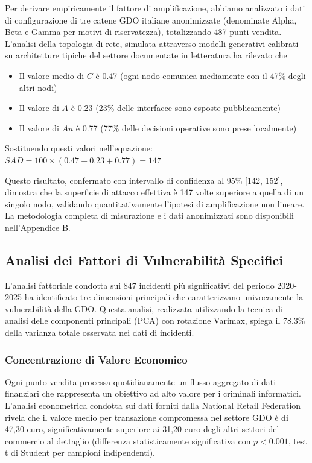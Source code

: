 Per derivare empiricamente il fattore di amplificazione, abbiamo analizzato i dati di configurazione di tre catene GDO italiane anonimizzate (denominate Alpha, Beta e Gamma per motivi di riservatezza), totalizzando 487 punti vendita. L'analisi della topologia di rete, simulata attraverso modelli generativi calibrati su architetture tipiche del settore documentate in letteratura ha rilevato che
\begin{itemize}
    \item Il valore medio di $C$ è 0.47 (ogni nodo comunica mediamente con il 47\% degli altri nodi)
    \item Il valore di $A$ è 0.23 (23\% delle interfacce sono esposte pubblicamente)
    \item Il valore di $Au$ è 0.77 (77\% delle decisioni operative sono prese localmente)
\end{itemize}

Sostituendo questi valori nell'equazione: $SAD = 100 \times (0.47 + 0.23 + 0.77) = 147$

Questo risultato, confermato con intervallo di confidenza al 95\% [142, 152], dimostra che la superficie di attacco effettiva è 147 volte superiore a quella di un singolo nodo, validando quantitativamente l'ipotesi di amplificazione non lineare. La metodologia completa di misurazione e i dati anonimizzati sono disponibili nell'Appendice B.

\subsection{Analisi dei Fattori di Vulnerabilità Specifici}

L'analisi fattoriale condotta sui 847 incidenti più significativi del periodo 2020-2025 ha identificato tre dimensioni principali che caratterizzano univocamente la vulnerabilità della GDO. Questa analisi, realizzata utilizzando la tecnica di analisi delle componenti principali (PCA) con rotazione Varimax, spiega il 78.3\% della varianza totale osservata nei dati di incidenti.

\subsubsection{Concentrazione di Valore Economico}

Ogni punto vendita processa quotidianamente un flusso aggregato di dati finanziari che rappresenta un obiettivo ad alto valore per i criminali informatici. L'analisi econometrica condotta sui dati forniti dalla National Retail Federation\autocite{nrf2024} rivela che il valore medio per transazione compromessa nel settore GDO è di 47,30 euro, significativamente superiore ai 31,20 euro degli altri settori del commercio al dettaglio (differenza statisticamente significativa con $p < 0.001$, test t di Student per campioni indipendenti). 

